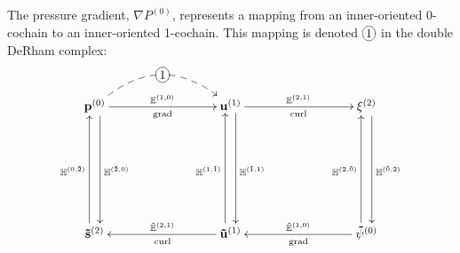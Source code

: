 The pressure gradient, $\nabla P^{(0)}$, represents a mapping from an inner-oriented 0-cochain to an inner-oriented 1-cochain. This mapping is denoted $\xymatrix{*+[o][F-]{1}}$  in the double DeRham complex:
\begin{equation}
    \begin{gathered}
        \xymatrix@=20ex{
            \mathbf{p}^{(0)} \ar[r]^{\mathbb{E}^{(1,0)}}_{\text{grad}} \ar@<1ex>[d]^{\mathbb{H}^{(\tilde{2},0)}} \ar @/^6ex/ @{-->} [r]|-*+[o][F-]{1}  & \mathbf{u}^{(1)} \ar[r]^{\mathbb{E}^{(2,1)}}_{\text{curl}} \ar@<1ex>[d]^{\mathbb{H}^{(\tilde{1},1)}} & \mathbf{\xi}^{(2)} \ar@<1ex>[d]^{\mathbb{H}^{(\tilde{0},2)}} \\
            \mathbf{\tilde{s}}^{(2)} \ar@<1ex>[u]^{\mathbb{H}^{(0,\tilde{2})}} & \mathbf{\tilde{u}}^{(1)} \ar[l]_{\tilde{\mathbb{E}}^{(2, 1)}}^{\text{curl}} \ar@<1ex>[u]^{\mathbb{H}^{(1,\tilde{1})}} & \mathbf{\tilde{\psi}}^{(0)} \ar[l]_{\tilde{\mathbb{E}}^{(1,0)}}^{\text{grad}} \ar@<1ex>[u]^{\mathbb{H}^{(2,\tilde{0})}}
        }
    \end{gathered}
    \label{eq:DeRhamPressure}
\end{equation}

